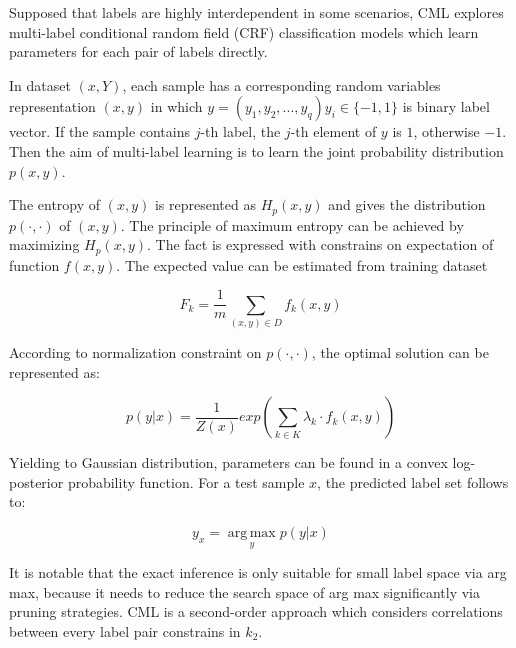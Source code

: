 Supposed that labels are highly interdependent in some scenarios, CML explores multi-label conditional random field (CRF) classification models which learn  parameters for each pair of labels directly\citep{ghamrawi2005collective}.

In dataset $(x,Y)$, each sample has a corresponding random variables representation $(x,y)$ in which $y = (y_{1},y_{2},...,y_{q}) y_{i} \in \{-1,1\}$ is binary label vector. If the sample contains $j$-th label, the $j$-th element of $y$ is $1$, otherwise $-1$. Then the aim of multi-label learning is to learn the joint probability distribution $p(x,y)$.

The entropy of $(x,y)$ is represented as $H_{p}(x,y)$ and gives the distribution $p(\cdot,\cdot)$ of $(x,y)$. The principle of maximum entropy can be achieved by maximizing $H_{p}(x,y)$. The fact is expressed with constrains on expectation of function $f(x,y)$. The expected value can be estimated from training dataset

\begin{equation}\label{eq:CMLExpect}
F_{k} = \frac{1}{m}\sum_{(x,y) \in D}f_{k}(x,y)
\end{equation}

According to normalization constraint on $p(\cdot,\cdot)$, the optimal solution can be represented as:

\begin{equation}\label{eq:CMLOptimal}
p(y|x) = \frac{1}{Z(x)}exp(\sum_{k \in K}\lambda_{k} \cdot f_{k}(x,y))
\end{equation}

Yielding to Gaussian distribution, parameters can be found in a convex log-posterior probability function. For a test sample $x$, the predicted label set follows to:

\begin{equation}\label{eq:CMLLabel}
y_{x} = \operatorname*{arg\,max}_{y} p(y|x)
\end{equation}

It is notable that the exact inference is only suitable for small label space via arg max, because it needs to reduce the search space of arg max significantly via pruning strategies. CML is a second-order approach which considers correlations between every label pair constrains in $k_{2}$. 